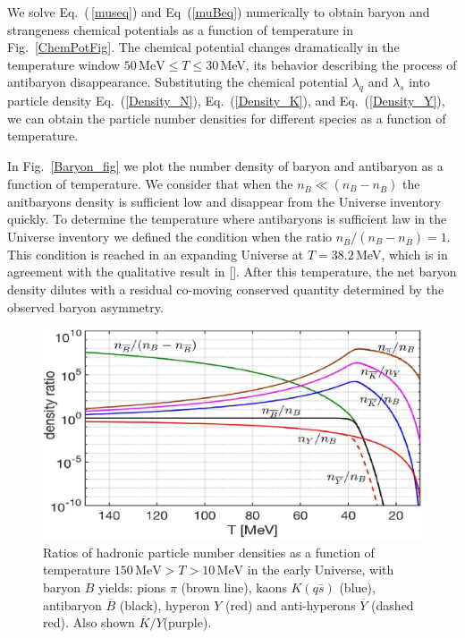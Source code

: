 We solve Eq.~(\,\ref{museq}) and Eq~(\ref{muBeq}) numerically to obtain baryon and strangeness chemical potentials as a function of temperature in Fig.~\ref{ChemPotFig}. The chemical potential changes dramatically in the temperature window $50\,\mathrm{MeV}\le T\le 30$\,MeV, its behavior describing the process of antibaryon disappearance. Substituting the chemical potential $\lambda_q$ and $\lambda_s$ into particle density Eq.~(\ref{Density_N}), Eq.~(\ref{Density_K}), and Eq.~(\ref{Density_Y}), we can obtain the particle number densities for different species as a function of temperature.

In Fig.~\ref{Baryon_fig} we plot the number density of baryon and antibaryon as a function of temperature. We consider that when the  $n_{\overline B}\ll(n_B-n_{\overline B})$ the anitbaryons density is sufficient low and disappear from the Universe inventory quickly. To determine the temperature where antibaryons is sufficient law in the Universe inventory we defined the condition when the ratio $n_{\overline B}/(n_B-n_{\overline B})=1$. This condition is reached in an expanding Universe at $T=38.2$\,MeV, which is in agreement with the qualitative result in [\cite{kolb1990early}]. After this temperature, the net baryon density dilutes with a residual co-moving conserved quantity determined by the observed baryon asymmetry.



\begin{figure}[bt]
\centering
\includegraphics[width=0.85\linewidth]{./plots/Meson_Baryon_density_ratio_C.jpg}
\caption{Ratios of hadronic particle number densities as a function of temperature $150\,\mathrm{MeV}> T>10\,\mathrm{MeV}$ in the early Universe, with baryon $B$ yields: pions $\pi$ (brown line), kaons $K( q\bar s)$ (blue), antibaryon $\overline B$ (black), hyperon $Y$ (red) and anti-hyperons $\overline Y$ (dashed red). Also shown $\overline K/Y$(purple).}
\label{EquilibPartRatiosFig}
\end{figure}

